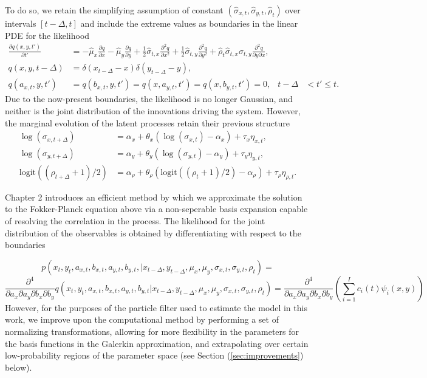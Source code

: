 \documentclass[10pt]{article}
\begin{document}
To do so, we retain the simplifying assumption of constant
$(\hat{\sigma}_{x,t}, \hat{\sigma}_{y,t}, \hat{\rho}_t)$ over
intervals $[t-\Delta,t]$ and include the extreme values as boundaries
in the linear PDE for the likelihood
\begin{align*}
  \frac{\partial q(x,y,t')}{\partial t'} &= -\hat{\mu}_x
  \frac{\partial q}{\partial x} -\hat{\mu}_y
  \frac{\partial q}{\partial y}  + \frac{1}{2} \hat{\sigma}_{t,x}
  \frac{\partial^2 q}{\partial x^2} + \frac{1}{2} \hat{\sigma}_{t,y}
                                           \frac{\partial^2 q}{\partial y^2} + \hat{\rho}_t\hat{\sigma}_{t,x}\hat{\sigma}_{t,y}\frac{\partial^2 q}{\partial y \partial x}, \\
  q(x,y,t-\Delta) &= \delta(x_{t-\Delta}-x)\delta(y_{t-\Delta} - y), \\
  q(a_{x,t}, y,t') &= q(b_{x,t},y,t') = q(x,a_{y,t},t') = q(x,b_{y,t},t') = 0,& t-\Delta &< t' \leq t.
\end{align*}
Due to the now-present boundaries, the likelihood is no longer
Gaussian, and neither is the joint distribution of the innovations
driving the system. However, the marginal evolution of the latent
processes retain their previous structure
\begin{align}
   \log(\sigma_{x,t+\Delta}) &= \alpha_x + \theta_x(\log(\sigma_{x,t}) - \alpha_x) + \tau_x \eta_{x,t}, \\
  \log(\sigma_{y,t+\Delta}) &= \alpha_y + \theta_y(\log(\sigma_{y,t}) - \alpha_y) + \tau_y \eta_{y,t}, \\
  \mbox{logit}((\rho_{t+\Delta} + 1)/2) &= \alpha_\rho + \theta_\rho\left(\mbox{logit}((\rho_{t}+1)/2) - \alpha_\rho\right) + \tau_{\rho} \eta_{\rho,t}. \label{eq:correlation-evolution}
\end{align}

Chapter 2 introduces an efficient method by which we approximate the
solution to the Fokker-Planck equation above via a non-seperable basis
expansion capable of resolving the correlation in the process. The
likelihood for the joint distribution of the observables is obtained
by differentiating with respect to the boundaries

\[
  p(x_t,y_t, a_{x,t}, b_{x,t}, a_{y,t},b_{y,t},| x_{t-\Delta},
  y_{t-\Delta}, \mu_x, \mu_y, \sigma_{x,t}, \sigma_{y,t}, \rho_t) =
\]
\[
  \frac{\partial^4}{\partial a_x \partial a_y\partial b_x \partial
    b_y} q(x_t, y_t, a_{x,t}, b_{x,t}, a_{y,t}, b_{y,t} |
  x_{t-\Delta}, y_{t-\Delta}, \mu_x, \mu_y, \sigma_{x,t},
  \sigma_{y,t}, \rho_t) = \frac{\partial^4}{\partial a_x \partial
    a_y\partial b_x \partial b_y} \left( \sum_{i=1}^I c_i(t)
    \psi_i(x,y) \right)
\]
However, for the purposes of the particle filter used to estimate the
model in this work, we improve upon the computational method by
performing a set of normalizing transformations, allowing for more
flexibility in the parameters for the basis functions in the Galerkin
approximation, and extrapolating over certain low-probability regions
of the parameter space (see Section (\ref{sec:improvements}) below).
\end{document}
